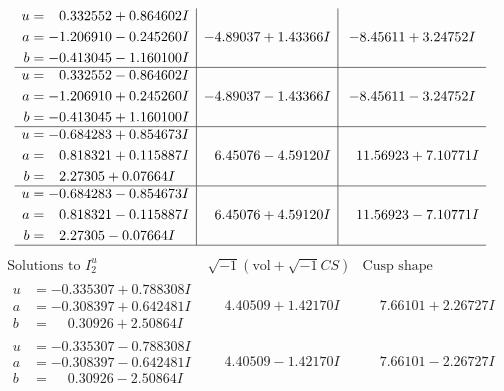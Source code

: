 \documentclass[1p]{elsarticle_modified}
\theoremstyle{definition}
\newcommand{\I}{\sqrt{-1}}
\begin{document}
$$\begin{array}{c|c|c}
\begin{aligned}
u &= \phantom{-}0.332552 + 0.864602 I \\
a &= -1.206910 - 0.245260 I \\
b &= -0.413045 - 1.160100 I\end{aligned}
 & -4.89037 + 1.43366 I & -8.45611 + 3.24752 I \\ \hline\begin{aligned}
u &= \phantom{-}0.332552 - 0.864602 I \\
a &= -1.206910 + 0.245260 I \\
b &= -0.413045 + 1.160100 I\end{aligned}
 & -4.89037 - 1.43366 I & -8.45611 - 3.24752 I \\ \hline\begin{aligned}
u &= -0.684283 + 0.854673 I \\
a &= \phantom{-}0.818321 + 0.115887 I \\
b &= \phantom{-}2.27305 + 0.07664 I\end{aligned}
 & \phantom{-}6.45076 - 4.59120 I & \phantom{-}11.56923 + 7.10771 I \\ \hline\begin{aligned}
u &= -0.684283 - 0.854673 I \\
a &= \phantom{-}0.818321 - 0.115887 I \\
b &= \phantom{-}2.27305 - 0.07664 I\end{aligned}
 & \phantom{-}6.45076 + 4.59120 I & \phantom{-}11.56923 - 7.10771 I\\
 \hline 
 \end{array}$$\newpage$$\begin{array}{c|c|c}  
\text{Solutions to }I^u_{2}& \I (\text{vol} + \sqrt{-1}CS) & \text{Cusp shape}\\
 \hline 
\begin{aligned}
u &= -0.335307 + 0.788308 I \\
a &= -0.308397 + 0.642481 I \\
b &= \phantom{-}0.30926 + 2.50864 I\end{aligned}
 & \phantom{-}4.40509 + 1.42170 I & \phantom{-}7.66101 + 2.26727 I \\ \hline\begin{aligned}
u &= -0.335307 - 0.788308 I \\
a &= -0.308397 - 0.642481 I \\
b &= \phantom{-}0.30926 - 2.50864 I\end{aligned}
 & \phantom{-}4.40509 - 1.42170 I & \phantom{-}7.66101 - 2.26727 I \\ \hline\begin{aligned}

\end{aligned}
\end{array}$$
\end{document}
